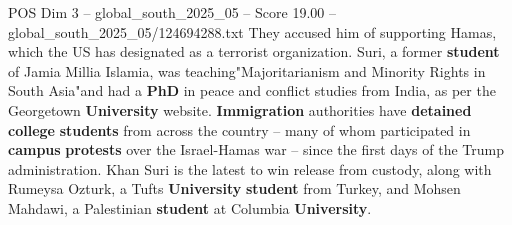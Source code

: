 \begin{textsample}{POS Dim 3 – global\_south\_2025\_05 – Score 19.00 – global\_south\_2025\_05/124694288.txt}
They accused him of supporting Hamas, which the US has designated as a terrorist organization.
Suri, a former \textbf{student} of Jamia Millia Islamia, was teaching"Majoritarianism and Minority Rights in South Asia"and had a \textbf{PhD} in peace and conflict studies from India, as per the Georgetown \textbf{University} website. \textbf{Immigration} authorities have \textbf{detained} \textbf{college} \textbf{students} from across the country -- many of whom participated in \textbf{campus} \textbf{protests} over the Israel-Hamas war -- since the first days of the Trump administration.
Khan Suri is the latest to win release from custody, along with Rumeysa Ozturk, a Tufts \textbf{University} \textbf{student} from Turkey, and Mohsen Mahdawi, a Palestinian \textbf{student} at Columbia \textbf{University}.

\end{textsample}
